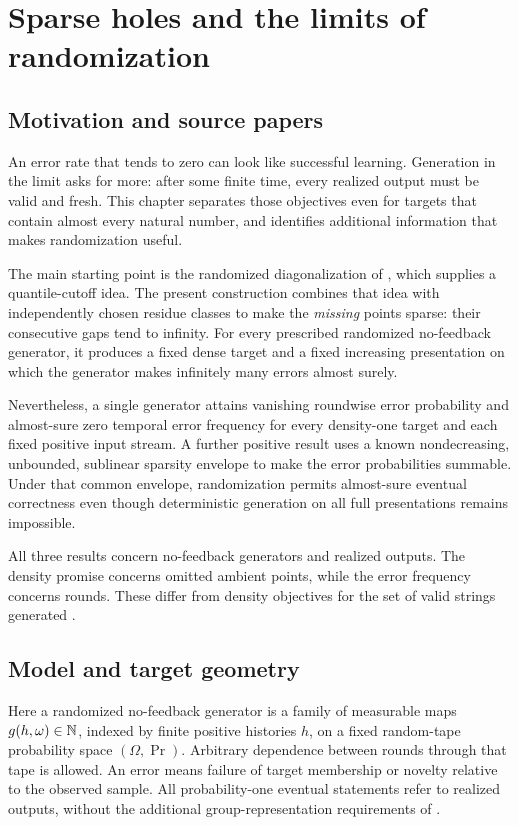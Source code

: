\section{Sparse holes and the limits of randomization}
\label{sh:chapter}
\subsection{Motivation and source papers}
An error rate that tends to zero can look like successful learning. Generation in the limit asks for more: after some finite time, every realized output must be valid and fresh. This chapter separates those objectives even for targets that contain almost every natural number, and identifies additional information that makes randomization useful.

The main starting point is the randomized diagonalization of \citet{P10}, which supplies a quantile-cutoff idea. The present construction combines that idea with independently chosen residue classes to make the \emph{missing} points sparse: their consecutive gaps tend to infinity. For every prescribed randomized no-feedback generator, it produces a fixed dense target and a fixed increasing presentation on which the generator makes infinitely many errors almost surely.

Nevertheless, a single generator attains vanishing roundwise error probability and almost-sure zero temporal error frequency for every density-one target and each fixed positive input stream. A further positive result uses a known nondecreasing, unbounded, sublinear sparsity envelope to make the error probabilities summable. Under that common envelope, randomization permits almost-sure eventual correctness even though deterministic generation on all full presentations remains impossible.

All three results concern no-feedback generators and realized outputs. The density promise concerns omitted ambient points, while the error frequency concerns rounds. These differ from density objectives for the set of valid strings generated \citep{P07,P23}.

\subsection{Model and target geometry}
Here a randomized no-feedback generator is a family of measurable maps $g(h,\omega)\in\mathbb N$, indexed by finite positive histories $h$, on a fixed random-tape probability space $(\Omega,\Pr)$. Arbitrary dependence between rounds through that tape is allowed. An error means failure of target membership or novelty relative to the observed sample. All probability-one eventual statements refer to realized outputs, without the additional group-representation requirements of \citet{P09}.


